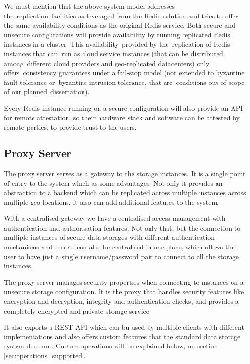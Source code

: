 We must mention that the above system model addresses the replication facilities as leveraged from the Redis solution and tries to offer the same availability conditions as the original Redis service. Both secure and unsecure configurations will provide availability by running replicated Redis instances in a cluster. This availability provided by the replication of Redis instances that can run as cloud service instances (that can be distributed among different cloud providers and geo-replicated datacenters) only offers consistency guarantees under a fail-stop model (not extended to byzantine fault tolerance or byzantine intrusion tolerance, that are conditions out of scope of our planned dissertation).

Every Redis instance running on a secure configuration will also provide an API for remote attestation, so their hardware stack and software can be attested by remote parties, to provide trust to the users.

\subsection{Proxy Server}
\label{ssec:system_model_proxy_server}

The proxy server serves as a gateway to the storage instances. It is a single point of entry to the system which as some advantages. Not only it provides an abstraction to a backend which can be replicated across multiple instances across multiple geo-locations, it also can add additional features to the system. 

With a centralised gateway we have a centralised access management with authentication and authorisation features. Not only that, but the connection to multiple instances of secure data storages with different authentication mechanisms and secrets can also be centralised in one place, which allows the user to have just a single username/password pair to connect to all the storage instances.

The proxy server manages security properties when connecting to instances on a unsecure storage configuration. It is the proxy that handles security features like encryption and decryption, integrity and authentication checks, and provides a completely encrypted and private storage service.

It also exports a REST API which can bu used by multiple clients with different implementations and also offers custom features that the standard data storage system does not. Custom operations will be explained below, on section \ref{sec:operations_supported}.

